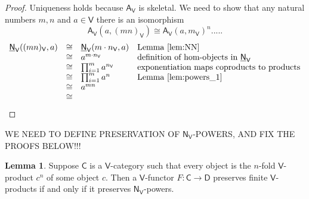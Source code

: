 \documentclass{amsart}
\theoremstyle{definition}
\newtheorem{lemma}[theorem]{Lemma}
\newcommand{\NN}{\mathsf{N}}
\newcommand{\A}{\mathsf{A}}
\newcommand{\V}{\mathsf{V}}
\newcommand{\D}{\mathsf{D}}
\newcommand{\C}{\mathsf{C}}
\newcommand{\maps}{\colon}
\begin{document}
\begin{proof}
Uniqueness holds because $\A_\V$ is skeletal.  We need to show 
that any natural numbers $m,n$ and $a \in \V$ there is an isomorphism
\[     \A_\V(a, (mn)_\V) \cong \A_\V(a,m_\V)^n  .....\]
\[\begin{array}{rcll}
	\underline{\NN}_\V((mn)_\V, a) & \cong & \underline{\NN}_\V(m \cdot n_\V,a) & \text{Lemma \ref{lem:NN}} \\
	&\cong &  a^{m \cdot n_\V} & \text{definition of hom-objects in $\underline{\NN}_\V$} \\
	&\cong & \prod_{i=1}^m a^{n_\V} & \text{exponentiation maps coproducts to products} \\
	&\cong & \prod_{i=1}^m a^n  & \text{Lemma \ref{lem:powers_1}} \\
	&\cong& a^{mn} \\
	&\cong& 
\end{array}
\]
\end{proof}	
\fi

WE NEED TO DEFINE PRESERVATION OF $\NN_\V$-POWERS, AND FIX THE PROOFS BELOW!!!

\begin{lemma}
\label{lem:powers_3}
Suppose $\C$ is a $\V$-category such that every object is the $n$-fold $\V$-product $c^n$ of
some object $c$.   Then a $\V$-functor $F \maps \C \to \D$ preserves finite $\V$-products
if and only if it preserves $\NN_\V$-powers.
\end{lemma}
\end{document}
